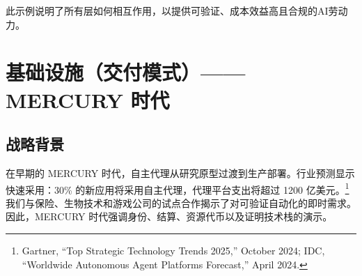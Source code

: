 \documentclass[11pt]{article}
\begin{document}
此示例说明了所有层如何相互作用，以提供可验证、成本效益高且合规的AI劳动力。

\section{基础设施（交付模式）—— MERCURY 时代}
\subsection{战略背景}
在早期的 MERCURY 时代，自主代理从研究原型过渡到生产部署。行业预测显示快速采用：30\% 的新应用将采用自主代理，代理平台支出将超过 1200 亿美元。\footnote{Gartner, ``Top Strategic Technology Trends 2025,'' October 2024; IDC, ``Worldwide Autonomous Agent Platforms Forecast,'' April 2024.} 我们与保险、生物技术和游戏公司的试点合作揭示了对可验证自动化的即时需求。因此，MERCURY 时代强调身份、结算、资源代币以及证明技术栈的演示。
\end{document}
